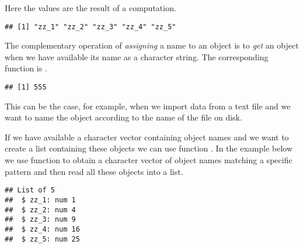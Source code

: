 \documentclass[krantz2]{krantz}\usepackage{knitr}%
\begin{document}
Here the  values are the result of a computation.

\begin{knitrout}\footnotesize
{}\color{fgcolor}\begin{kframe}
\begin{alltt}
   \hlopt{:}\hlstd{) \{}
   \hlstd{(}\hlstd{(}  \hlstd{=} \hlopt{^}\hlstd{)}
\hlstd{\}}
\hlstd{(} \hlstd{=} \hlstd{)}
\end{alltt}
\begin{verbatim}
## [1] "zz_1" "zz_2" "zz_3" "zz_4" "zz_5"
\end{verbatim}
\end{kframe}
\end{knitrout}

The complementary operation of \emph{assigning} a name to an object is to \emph{get} an object when we have available its name as a character string. The corresponding function is .

\begin{knitrout}\footnotesize
{}\color{fgcolor}\begin{kframe}
\begin{alltt}
 \hlkwb{<-} 
\hlstd{(}\hlstd{)}
\end{alltt}
\begin{verbatim}
## [1] 555
\end{verbatim}
\end{kframe}
\end{knitrout}

This can be the case, for example, when we import data from a text file and we want to name the object according to the name of the file on disk.

If we have available a character vector containing object names and we want to create a list containing these objects we can use function . In the example below we use function  to obtain a character vector of object names matching a specific pattern and then read all these objects into a list.

\begin{knitrout}\footnotesize
{}\color{fgcolor}\begin{kframe}
\begin{alltt}
 \hlkwb{<-} \hlstd{(} \hlstd{=} \hlstd{)}
 \hlkwb{<-} 
\end{alltt}
\begin{verbatim}
## List of 5
##  $ zz_1: num 1
##  $ zz_2: num 4
##  $ zz_3: num 9
##  $ zz_4: num 16
##  $ zz_5: num 25
\end{verbatim}
\end{kframe}
\end{knitrout}
\end{document}
